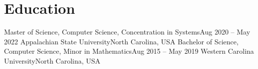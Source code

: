 \section{Education}
  \resumeSubHeadingListStart
    \resumeSubheading
      {Master of Science, Computer Science, Concentration in Systems}{Aug 2020 -- May 2022}
      {Appalachian State University}{North Carolina, USA}
      \resumeItemListStart
      \resumeItemListEnd
    \resumeSubheading
      {Bachelor of Science, Computer Science, Minor in Mathematics}{Aug 2015 -- May 2019}
      {Western Carolina University}{North Carolina, USA}
      \resumeItemListStart
      \resumeItemListEnd
  \resumeSubHeadingListEnd
